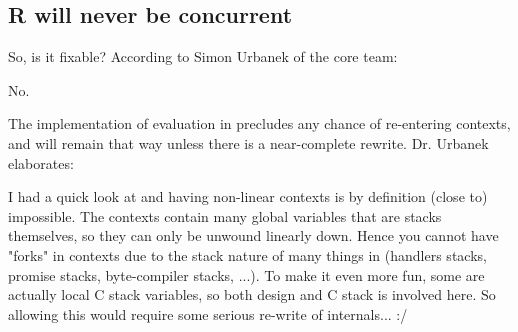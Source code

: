 \subsection{R will never be concurrent}\label{sec:no}

So, is it fixable?
According to Simon Urbanek of the \R core team:

\begin{displayquote}
No.
\end{displayquote}

The implementation of evaluation in \R precludes any chance of re-entering contexts, and will remain that way unless there is a near-complete rewrite. Dr. Urbanek elaborates:

\begin{displayquote}
I had a quick look at \R and having non-linear contexts is by definition (close to) impossible. The contexts contain many global variables that are stacks themselves, so they can only be unwound linearly down. Hence you cannot have "forks" in contexts due to the stack nature of many things in \R (handlers stacks, promise stacks, byte-compiler stacks, ...). To make it even more fun, some are actually local C stack variables, so both \R design and C stack is involved here. So allowing this would require some serious re-write of \R internals... :/
\end{displayquote}

